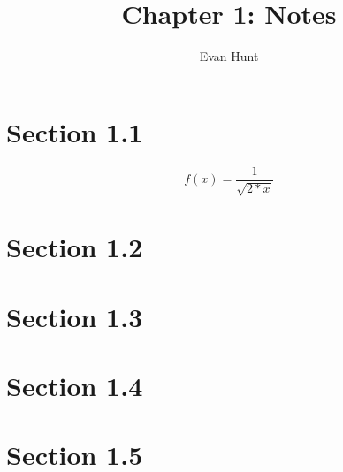\documentclass[12pt]{article}
\title{Chapter 1: Notes}
\author{Evan Hunt}
\begin{document}
    \maketitle

    \section[]{Section 1.1}
        \begin{equation}
            f(x) = \frac{1}{\sqrt{2*x}}
        \end{equation}
    \section[]{Section 1.2}
    \section[]{Section 1.3}
    \section[]{Section 1.4}
    \section[]{Section 1.5}
\end{document}
